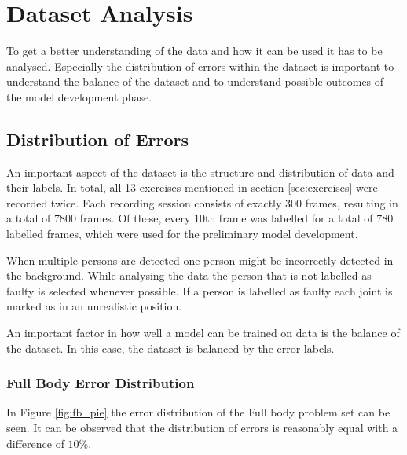\section{Dataset Analysis}
\label{sec:dataset}

To get a better understanding of the data and how it can be used it has to be analysed. Especially the distribution of errors within the dataset is important to understand the balance of the dataset and to understand possible outcomes of the model development phase.

\subsection{Distribution of Errors}

An important aspect of the dataset is the structure and distribution of data and their labels. In total, all 13 exercises mentioned in section \ref{sec:exercises} were recorded twice. Each recording session consists of exactly 300 frames, resulting in a total of 7800 frames. Of these, every 10th frame was labelled for a total of 780 labelled frames, which were used for the preliminary model development.

When multiple persons are detected one person might be incorrectly detected in the background. While analysing the data the person that is not labelled as faulty is selected whenever possible. If a person is labelled as faulty each joint is marked as in an unrealistic position.

An important factor in how well a model can be trained on data is the balance of the dataset. In this case, the dataset is balanced by the error labels. 

\subsubsection{Full Body Error Distribution}

In Figure \ref{fig:fb_pie} the error distribution of the Full body problem set can be seen. It can be observed that the distribution of errors is reasonably equal with a difference of $10\%$. 

